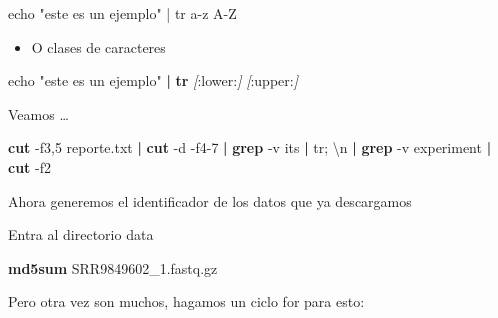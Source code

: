 \documentclass[
]{book}
\newenvironment{Shaded}{\begin{snugshade}}{\end{snugshade}}
\newcommand{\AttributeTok}[1]{\textcolor[rgb]{0.13,0.29,0.53}{#1}}
\newcommand{\BuiltInTok}[1]{#1}
\newcommand{\ControlFlowTok}[1]{\textcolor[rgb]{0.13,0.29,0.53}{\textbf{#1}}}
\newcommand{\ExtensionTok}[1]{#1}
\newcommand{\FunctionTok}[1]{\textcolor[rgb]{0.13,0.29,0.53}{\textbf{#1}}}
\newcommand{\KeywordTok}[1]{\textcolor[rgb]{0.13,0.29,0.53}{\textbf{#1}}}
\newcommand{\NormalTok}[1]{#1}
\newcommand{\PreprocessorTok}[1]{\textcolor[rgb]{0.56,0.35,0.01}{\textit{#1}}}
\newcommand{\SpecialStringTok}[1]{\textcolor[rgb]{0.31,0.60,0.02}{#1}}
\newcommand{\StringTok}[1]{\textcolor[rgb]{0.31,0.60,0.02}{#1}}
\newcommand{\VariableTok}[1]{\textcolor[rgb]{0.00,0.00,0.00}{#1}}
\providecommand{\tightlist}{%
  \setlength{\itemsep}{0pt}\setlength{\parskip}{0pt}}
\begin{document}
\begin{Shaded}
\begin{Highlighting}[]
\NormalTok{echo "este es un ejemplo" | tr a{-}z A{-}Z }
\end{Highlighting}
\end{Shaded}

\begin{itemize}
\tightlist
\item
  O clases de caracteres
\end{itemize}

\begin{Shaded}
\begin{Highlighting}[]
\BuiltInTok{echo} \StringTok{"este es un ejemplo"} \KeywordTok{|} \FunctionTok{tr} \PreprocessorTok{[}\SpecialStringTok{:lower:}\PreprocessorTok{]} \PreprocessorTok{[}\SpecialStringTok{:upper:}\PreprocessorTok{]} 
\end{Highlighting}
\end{Shaded}

Veamos \ldots{}

\begin{Shaded}
\begin{Highlighting}[]
\FunctionTok{cut} \AttributeTok{{-}f3,5}\NormalTok{ reporte.txt }\KeywordTok{|} \FunctionTok{cut} \AttributeTok{{-}d}\StringTok{\textquotesingle{} \textquotesingle{}} \AttributeTok{{-}f4{-}7} \KeywordTok{|} \FunctionTok{grep} \AttributeTok{{-}v} \StringTok{\textquotesingle{}its\textquotesingle{}} \KeywordTok{|} \ExtensionTok{tr}\StringTok{\textquotesingle{};\textquotesingle{}} \StringTok{\textquotesingle{}\textbackslash{}n\textquotesingle{}} \KeywordTok{|} \FunctionTok{grep} \AttributeTok{{-}v} \StringTok{\textquotesingle{}experiment\textquotesingle{}} \KeywordTok{|} \FunctionTok{cut} \AttributeTok{{-}f2}
\end{Highlighting}
\end{Shaded}

Ahora generemos el identificador de los datos que ya descargamos

Entra al directorio data

\begin{Shaded}
\begin{Highlighting}[]
\FunctionTok{md5sum}\NormalTok{ SRR9849602\_1.fastq.gz}
\end{Highlighting}
\end{Shaded}

Pero otra vez son muchos, hagamos un ciclo for para esto:

\begin{Shaded}
\end{Shaded}
\end{document}
